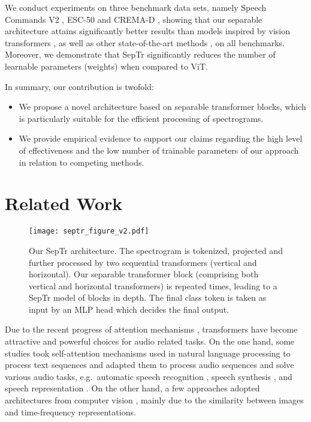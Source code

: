 \documentclass[a4paper]{article}
\begin{document}
We conduct experiments on three benchmark data sets, namely Speech Commands V2 \cite{Warden-ArXiv-2018}, ESC-50 \cite{Piczak-ACMMM-2015} and CREMA-D \cite{Cao-TAC-2014}, showing that our separable architecture attains significantly better results than models inspired by vision transformers \cite{Gong-INTERSPEECH-2021}, as well as other state-of-the-art methods \cite{georgescu2020non,He-CVPRW-2020,Kim-DCASE-2020,Majumdar-INTERSPEECH-2020,Ristea-INTERSPEECH-2021,Sailor-INTERSPEECH-2017,Shukla-ICASSP-2020}, on all benchmarks. Moreover, we demonstrate that SepTr significantly reduces the number of learnable parameters (weights) when compared to ViT.

In summary, our contribution is twofold:
\begin{itemize}
    \item \vspace{-0.1cm} We propose a novel architecture based on separable transformer blocks, which is particularly suitable for the efficient processing of spectrograms.  
    \item \vspace{-0.1cm} We provide empirical evidence to support our claims regarding the high level of effectiveness and the low number of trainable parameters of our approach in relation to competing methods.
\end{itemize}

\section{Related Work}

\begin{figure*}[!ht]
\begin{center}
\centerline{\texttt{[image: septr\_figure\_v2.pdf]}}
\vspace{-0.25cm}
\caption{Our SepTr architecture. The spectrogram is tokenized, projected and further processed by two sequential transformers (vertical and horizontal). Our separable transformer block (comprising both vertical and horizontal transformers) is repeated  times, leading to a SepTr model of  blocks in depth. The final class token is taken as input by an MLP head which decides the final output. }
\label{fig_septr}
\end{center}
\vspace{-1.0cm}
\end{figure*}

Due to the recent progress of attention mechanisms \cite{Vaswani-NIPS-2017}, transformers have become attractive and powerful choices for audio related tasks. On the one hand, some studies took self-attention mechanisms used in natural language processing to process text sequences and adapted them to process audio sequences and solve various audio tasks, e.g.~automatic speech recognition \cite{Kanda-INTERSPEECH-2021, Lohrenz-INTERSPEECH-2021, Leong-INTERSPEECH-2021}, speech synthesis \cite{Wu-INTERSPEECH-2021}, and speech representation \cite{Luo-INTERSPEECH-2021}. On the other hand, a few approaches adopted architectures from computer vision \cite{Gong-INTERSPEECH-2021,Illium-INTERSPEECH-2021}, mainly due to the similarity between images and time-frequency representations.
\end{document}
